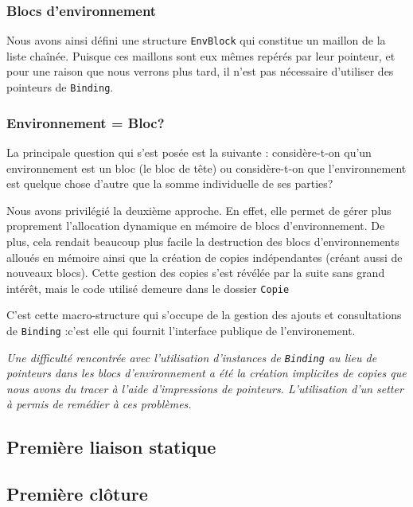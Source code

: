 \documentclass[a4paper,11pt]{article}
\newcommand{\dbend}{{\manual\char127}}
\newenvironment{attention}%
{\description\item[\dbend]\sl}%
{\enddescription}
\begin{document}
\subsubsection{Blocs d’environnement}

Nous avons ainsi défini une structure \texttt{EnvBlock} qui constitue un maillon
de la liste chaînée. Puisque ces maillons sont eux mêmes repérés par leur
pointeur, et pour une raison que nous verrons plus tard, il n'est pas nécessaire
d'utiliser des pointeurs de \texttt{Binding}.

\subsubsection{Environnement = Bloc?}

La principale question qui s'est posée est la suivante : considère-t-on qu'un
environnement est un bloc (le bloc de \og tête\fg) ou considère-t-on que
l'environnement est quelque chose d'autre que la somme individuelle de ses
parties?

Nous avons privilégié la deuxième approche. En effet, elle permet de gérer plus
proprement l'allocation dynamique en mémoire de blocs d’environnement. De plus,
cela rendait beaucoup plus facile la destruction des blocs d’environnements
alloués en mémoire ainsi que la création de copies indépendantes (créant aussi
de nouveaux blocs). Cette gestion des copies s'est révélée par la suite sans
grand intérêt, mais le code utilisé demeure dans le dossier \texttt{Copie}

C'est cette macro-structure qui s'occupe de la gestion des ajouts et
consultations de \texttt{Binding} :c'est elle qui fournit l'interface publique
de l'environement.

\begin{attention}
  Une difficulté rencontrée avec l'utilisation d'instances de \texttt{Binding}
  au lieu de pointeurs dans les blocs d’environnement a été la création
  implicites de copies que nous avons du tracer à l'aide d'impressions de
  pointeurs. L'utilisation d'un setter à permis de remédier à ces problèmes.
\end{attention}

\subsection{Première liaison statique}

\subsection{Première clôture}
\end{document}
